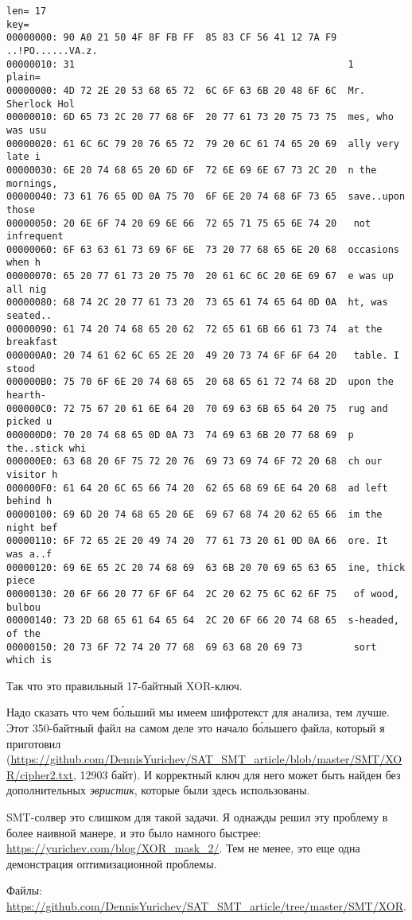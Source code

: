 \begin{lstlisting}
len= 17
key=
00000000: 90 A0 21 50 4F 8F FB FF  85 83 CF 56 41 12 7A F9  ..!PO......VA.z.
00000010: 31                                                1
plain=
00000000: 4D 72 2E 20 53 68 65 72  6C 6F 63 6B 20 48 6F 6C  Mr. Sherlock Hol
00000010: 6D 65 73 2C 20 77 68 6F  20 77 61 73 20 75 73 75  mes, who was usu
00000020: 61 6C 6C 79 20 76 65 72  79 20 6C 61 74 65 20 69  ally very late i
00000030: 6E 20 74 68 65 20 6D 6F  72 6E 69 6E 67 73 2C 20  n the mornings,
00000040: 73 61 76 65 0D 0A 75 70  6F 6E 20 74 68 6F 73 65  save..upon those
00000050: 20 6E 6F 74 20 69 6E 66  72 65 71 75 65 6E 74 20   not infrequent
00000060: 6F 63 63 61 73 69 6F 6E  73 20 77 68 65 6E 20 68  occasions when h
00000070: 65 20 77 61 73 20 75 70  20 61 6C 6C 20 6E 69 67  e was up all nig
00000080: 68 74 2C 20 77 61 73 20  73 65 61 74 65 64 0D 0A  ht, was seated..
00000090: 61 74 20 74 68 65 20 62  72 65 61 6B 66 61 73 74  at the breakfast
000000A0: 20 74 61 62 6C 65 2E 20  49 20 73 74 6F 6F 64 20   table. I stood
000000B0: 75 70 6F 6E 20 74 68 65  20 68 65 61 72 74 68 2D  upon the hearth-
000000C0: 72 75 67 20 61 6E 64 20  70 69 63 6B 65 64 20 75  rug and picked u
000000D0: 70 20 74 68 65 0D 0A 73  74 69 63 6B 20 77 68 69  p the..stick whi
000000E0: 63 68 20 6F 75 72 20 76  69 73 69 74 6F 72 20 68  ch our visitor h
000000F0: 61 64 20 6C 65 66 74 20  62 65 68 69 6E 64 20 68  ad left behind h
00000100: 69 6D 20 74 68 65 20 6E  69 67 68 74 20 62 65 66  im the night bef
00000110: 6F 72 65 2E 20 49 74 20  77 61 73 20 61 0D 0A 66  ore. It was a..f
00000120: 69 6E 65 2C 20 74 68 69  63 6B 20 70 69 65 63 65  ine, thick piece
00000130: 20 6F 66 20 77 6F 6F 64  2C 20 62 75 6C 62 6F 75   of wood, bulbou
00000140: 73 2D 68 65 61 64 65 64  2C 20 6F 66 20 74 68 65  s-headed, of the
00000150: 20 73 6F 72 74 20 77 68  69 63 68 20 69 73         sort which is
\end{lstlisting}

Так что это правильный 17-байтный XOR-ключ.

Надо сказать что чем б\'{о}льший мы имеем шифротекст для анализа, тем лучше.
Этот 350-байтный файл на самом деле это начало б\'{о}льшего файла, который я приготовил
(\url{https://github.com/DennisYurichev/SAT_SMT_article/blob/master/SMT/XOR/cipher2.txt}, 12903 байт).
И корректный ключ для него может быть найден без дополнительных \textit{эвристик}, которые были здесь использованы.

SMT-солвер это слишком для такой задачи. Я однажды решил эту проблему в более наивной манере, и это было намного быстрее:
\url{https://yurichev.com/blog/XOR_mask_2/}.
Тем не менее, это еще одна демонстрация оптимизационной проблемы.

Файлы: \url{https://github.com/DennisYurichev/SAT_SMT_article/tree/master/SMT/XOR}.

